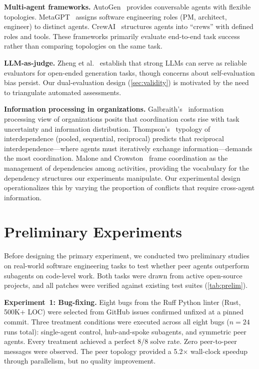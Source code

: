 \documentclass[11pt,letterpaper]{article}
\begin{document}
\textbf{Multi-agent frameworks.}
AutoGen~\cite{wu2023autogen} provides conversable agents with flexible
topologies. MetaGPT~\cite{hong2024metagpt} assigns software engineering
roles (PM, architect, engineer) to distinct agents. CrewAI~\cite{moura2023crewai}
structures agents into ``crews'' with defined roles and tools.
These frameworks primarily evaluate end-to-end task success rather
than comparing topologies on the same task.

\textbf{LLM-as-judge.}
Zheng et al.~\cite{zheng2024judging} establish that strong LLMs can
serve as reliable evaluators for open-ended generation tasks, though
concerns about self-evaluation bias persist.
Our dual-evaluation design (\cref{sec:validity}) is motivated by the
need to triangulate automated assessments.

\textbf{Information processing in organizations.}
Galbraith's~\cite{galbraith1974designing} information processing view of
organizations posits that coordination costs rise with task uncertainty
and information distribution. Thompson's~\cite{thompson1967organizations}
typology of interdependence (pooled, sequential, reciprocal) predicts
that reciprocal interdependence---where agents must iteratively exchange
information---demands the most coordination. Malone and
Crowston~\cite{malone1994interdependence} frame coordination as the
management of dependencies among activities, providing the vocabulary
for the dependency structures our experiments manipulate. Our
experimental design operationalizes this by varying the proportion of
conflicts that require cross-agent information.


\section{Preliminary Experiments}
\label{sec:prelim}

Before designing the primary experiment, we conducted two preliminary
studies on real-world software engineering tasks to test whether peer
agents outperform subagents on code-level work. Both tasks were drawn
from active open-source projects, and all patches were verified against
existing test suites (\cref{tab:prelim}).

\textbf{Experiment~1: Bug-fixing.}
Eight bugs from the Ruff Python linter (Rust, 500K+ LOC) were selected
from GitHub issues confirmed unfixed at a pinned commit. Three treatment
conditions were executed across all eight bugs ($n = 24$ runs total):
single-agent control, hub-and-spoke subagents, and symmetric peer agents.
Every treatment achieved a perfect 8/8 solve rate. Zero peer-to-peer
messages were observed. The peer topology provided a 5.2$\times$
wall-clock speedup through parallelism, but no quality improvement.
\end{document}
